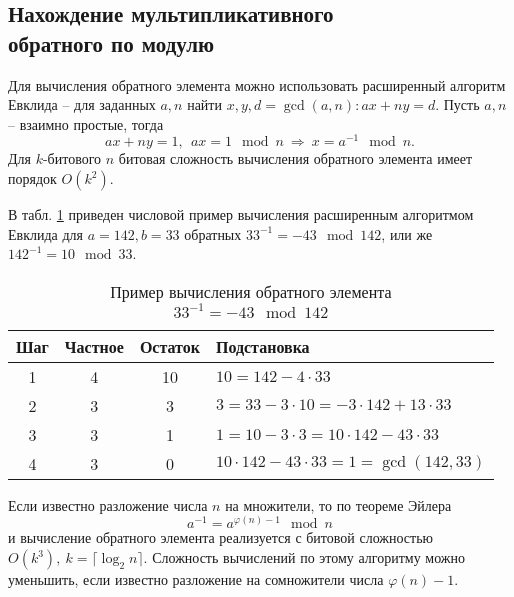 \subsection[Нахождение мультипликативного обратного]{Нахождение мультипликативного \protect\\ обратного по модулю}

Для вычисления обратного элемента можно использовать расширенный алгоритм Евклида -- для заданных $a, n$ найти $x, y, d = \gcd(a,n): ax + ny = d$. Пусть $a,n$ -- взаимно простые, тогда
    \[ ax + ny = 1, ~~ ax = 1 \mod n ~ \Rightarrow ~ x = a^{-1} \mod n. \]
Для $k$-битового $n$ битовая сложность вычисления обратного элемента имеет порядок $O(k^2)$.

\example
В табл. \ref{tab:extended-euclid-inverse} приведен числовой пример вычисления расширенным алгоритмом Евклида для $a=142, b=33$ обратных $33^{-1} = -43 \mod 142$, или же $142^{-1} = 10 \mod 33$.

\begin{table}[h!]
    \centering
    \caption{Пример вычисления обратного элемента \\ $33^{-1}  = -43 \mod 142$\label{tab:extended-euclid-inverse}}
    \begin{tabular}{|c|c|c|l|}
        \hline
        Шаг & Частное & Остаток & Подстановка \\
        \hline
        1 & 4 & 10 & $10 = 142 - 4 \cdot 33$ \\
        2 & 3 & 3  & $3 = 33 - 3 \cdot 10 = -3 \cdot 142 + 13 \cdot 33$ \\
        3 & 3 & 1  & $1 = 10 - 3 \cdot 3 = 10 \cdot 142 - 43 \cdot 33$ \\
        4 & 3 & 0  & $10 \cdot 142 - 43 \cdot 33 = 1 = \gcd(142,33)$ \\
        \hline
    \end{tabular}
\end{table}
\exampleend

Если известно разложение числа $n$ на множители, то по теореме Эйлера
    \[ a^{-1} = a^{\varphi(n) - 1} \mod n \]
и вычисление обратного элемента реализуется с битовой сложностью $O(k^3),~ k = \lceil \log_2 n \rceil$. Сложность вычислений по этому алгоритму можно уменьшить, если известно разложение на сомножители числа $\varphi(n) - 1$.
